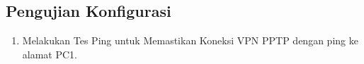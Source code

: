     \subsection*{Pengujian Konfigurasi}

    \begin{enumerate}
        \item Melakukan Tes Ping untuk Memastikan Koneksi VPN PPTP dengan ping ke alamat PC1.
    \end{enumerate}